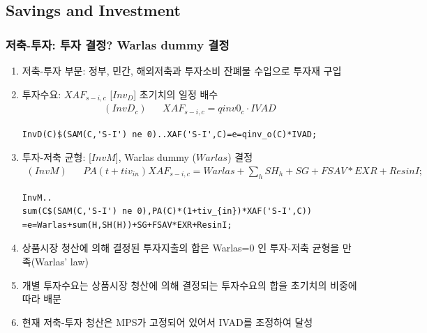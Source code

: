 \documentclass[10pt,compress,slidetop,%
			   hyperref={unicode},xcolor={svgnames},%
			   t]{beamer}
\begin{document}
\subsection{Savings and Investment}

\begin{frame}[fragile]
\frametitle{저축-투자: 투자 결정? Warlas dummy 결정}
\begin{scriptsize}
\begin{enumerate}
\item{저축-투자 부문: 정부, 민간, 해외저축과 투자소비 잔폐물 수입으로 투자재 구입}
\item{투자수요: $XAF_{s-i,c}$ [$Inv_D$] 초기치의 일정 배수}
\begin{eqnarray*}
(InvD_c)& &XAF_{s-i,c}=qinv0_c\cdot IVAD
\end{eqnarray*}
\begin{verbatim}
InvD(C)$(SAM(C,'S-I') ne 0)..XAF('S-I',C)=e=qinv_o(C)*IVAD;
\end{verbatim}
\item{투자-저축 균형: [$InvM$], Warlas dummy ($Warlas$) 결정}
\begin{eqnarray*}
(InvM)& &PA(t+tiv_{in})XAF_{s-i,c}=Warlas+\sum_h SH_h +SG+FSAV*EXR+ResinI;
\end{eqnarray*}
\begin{verbatim}
InvM..
sum(C$(SAM(C,'S-I') ne 0),PA(C)*(1+tiv_{in})*XAF('S-I',C))
=e=Warlas+sum(H,SH(H))+SG+FSAV*EXR+ResinI;
\end{verbatim}
\item{상품시장 청산에 의해 결정된 투자지출의 합은 Warlas=0 인 투자-저축 균형을 만족(Warlas' law)}
\item{개별 투자수요는 상품시장 청산에 의해 결정되는 투자수요의 합을 초기치의 비중에 따라 배분}
\item{현재 저축-투자 청산은 MPS가 고정되어 있어서 IVAD를 조정하여 달성} 
\begin{itemize}
\end{itemize}
\end{enumerate}
\end{scriptsize}
\end{frame}
\end{document}
